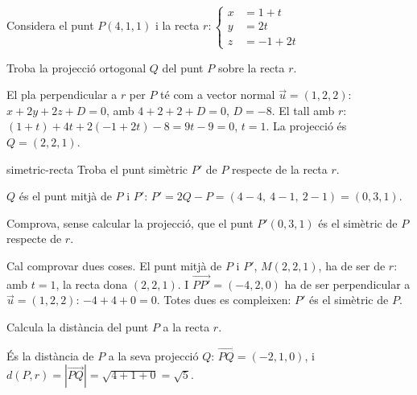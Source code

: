 Considera el punt $P(4,1,1)$ i la recta
$r\colon\left\{\begin{aligned}x&=1+t\\y&=2t\\z&=-1+2t\end{aligned}\right.$

\begin{apartats}

Troba la projecció ortogonal $Q$ del punt $P$ sobre la recta $r$.

\begin{solucio}
El pla perpendicular a $r$ per $P$ té com a vector normal $\vec u=(1,2,2)$: $x+2y+2z+D=0$, amb
$4+2+2+D=0$, $D=-8$. El tall amb $r$: $(1+t)+4t+2(-1+2t)-8=9t-9=0$, $t=1$. La projecció és
$Q=(2,2,1)$.
\end{solucio}

\begin{tria}{simetric-recta}
Troba el punt simètric $P'$ de $P$ respecte de la recta $r$.

\begin{solucio}
$Q$ és el punt mitjà de $P$ i $P'$: $P'=2Q-P=(4-4,\ 4-1,\ 2-1)=(0,3,1)$.
\end{solucio}

Comprova, sense calcular la projecció, que el punt $P'(0,3,1)$ és el simètric de $P$ respecte de $r$.

\begin{solucio}
Cal comprovar dues coses. El punt mitjà de $P$ i $P'$, $M(2,2,1)$, ha de ser de $r$: amb $t=1$, la
recta dona $(2,2,1)$. I $\overrightarrow{PP'}=(-4,2,0)$ ha de ser perpendicular a $\vec u=(1,2,2)$:
$-4+4+0=0$. Totes dues es compleixen: $P'$ és el simètric de $P$.
\end{solucio}
\end{tria}

\begin{nomesllarg}
Calcula la distància del punt $P$ a la recta $r$.

\begin{solucio}
És la distància de $P$ a la seva projecció $Q$: $\overrightarrow{PQ}=(-2,1,0)$, i
$d(P,r)=|\overrightarrow{PQ}|=\sqrt{4+1+0}=\sqrt5$.
\end{solucio}
\end{nomesllarg}

\end{apartats}
